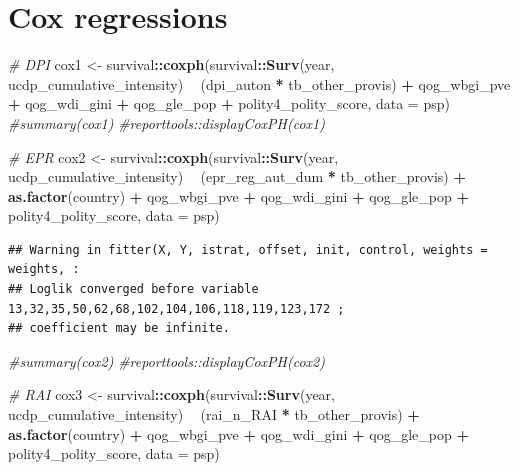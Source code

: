 \documentclass[
]{article}
\newenvironment{Shaded}{\begin{snugshade}}{\end{snugshade}}
\newcommand{\CommentTok}[1]{\textcolor[rgb]{0.56,0.35,0.01}{\textit{#1}}}
\newcommand{\DataTypeTok}[1]{\textcolor[rgb]{0.13,0.29,0.53}{#1}}
\newcommand{\KeywordTok}[1]{\textcolor[rgb]{0.13,0.29,0.53}{\textbf{#1}}}
\newcommand{\NormalTok}[1]{#1}
\newcommand{\OperatorTok}[1]{\textcolor[rgb]{0.81,0.36,0.00}{\textbf{#1}}}
\newcommand{\StringTok}[1]{\textcolor[rgb]{0.31,0.60,0.02}{#1}}
\begin{document}
\hypertarget{cox-regressions}{%
\section{Cox regressions}\label{cox-regressions}}

\begin{Shaded}
\begin{Highlighting}[]
\CommentTok{# DPI}
\NormalTok{cox1 <-}\StringTok{ }\NormalTok{survival}\OperatorTok{::}\KeywordTok{coxph}\NormalTok{(survival}\OperatorTok{::}\KeywordTok{Surv}\NormalTok{(year, ucdp_cumulative_intensity) }\OperatorTok{~}\StringTok{ }\NormalTok{(dpi_auton }\OperatorTok{*}\StringTok{ }\NormalTok{tb_other_provis) }\OperatorTok{+}\StringTok{ }\NormalTok{qog_wbgi_pve }\OperatorTok{+}\StringTok{ }\NormalTok{qog_wdi_gini }\OperatorTok{+}\StringTok{ }\NormalTok{qog_gle_pop }\OperatorTok{+}\StringTok{ }\NormalTok{polity4_polity_score, }\DataTypeTok{data =}\NormalTok{ psp)}
\CommentTok{#summary(cox1)}
\CommentTok{#reporttools::displayCoxPH(cox1)}

\CommentTok{# EPR}
\NormalTok{cox2 <-}\StringTok{ }\NormalTok{survival}\OperatorTok{::}\KeywordTok{coxph}\NormalTok{(survival}\OperatorTok{::}\KeywordTok{Surv}\NormalTok{(year, ucdp_cumulative_intensity) }\OperatorTok{~}\StringTok{ }\NormalTok{(epr_reg_aut_dum }\OperatorTok{*}\StringTok{ }\NormalTok{tb_other_provis) }\OperatorTok{+}\StringTok{ }\KeywordTok{as.factor}\NormalTok{(country) }\OperatorTok{+}\StringTok{ }\NormalTok{qog_wbgi_pve }\OperatorTok{+}\StringTok{ }\NormalTok{qog_wdi_gini }\OperatorTok{+}\StringTok{ }\NormalTok{qog_gle_pop }\OperatorTok{+}\StringTok{ }\NormalTok{polity4_polity_score, }\DataTypeTok{data =}\NormalTok{ psp)}
\end{Highlighting}
\end{Shaded}

\begin{verbatim}
## Warning in fitter(X, Y, istrat, offset, init, control, weights = weights, :
## Loglik converged before variable 13,32,35,50,62,68,102,104,106,118,119,123,172 ;
## coefficient may be infinite.
\end{verbatim}

\begin{Shaded}
\begin{Highlighting}[]
\CommentTok{#summary(cox2)}
\CommentTok{#reporttools::displayCoxPH(cox2)}

\CommentTok{# RAI}
\NormalTok{cox3 <-}\StringTok{ }\NormalTok{survival}\OperatorTok{::}\KeywordTok{coxph}\NormalTok{(survival}\OperatorTok{::}\KeywordTok{Surv}\NormalTok{(year, ucdp_cumulative_intensity) }\OperatorTok{~}\StringTok{ }\NormalTok{(rai_n_RAI }\OperatorTok{*}\StringTok{ }\NormalTok{tb_other_provis) }\OperatorTok{+}\StringTok{ }\KeywordTok{as.factor}\NormalTok{(country) }\OperatorTok{+}\StringTok{ }\NormalTok{qog_wbgi_pve }\OperatorTok{+}\StringTok{ }\NormalTok{qog_wdi_gini }\OperatorTok{+}\StringTok{ }\NormalTok{qog_gle_pop }\OperatorTok{+}\StringTok{ }\NormalTok{polity4_polity_score, }\DataTypeTok{data =}\NormalTok{ psp)}
\end{Highlighting}
\end{Shaded}
\end{document}
